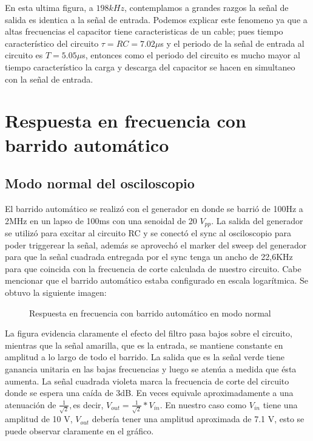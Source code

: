 En esta ultima figura, a $198kHz$, contemplamos a grandes razgos la señal de salida es identica a la señal de entrada. Podemos explicar este fenomeno ya que a altas frecuencias el capacitor tiene caracteristicas de un cable; pues tiempo característico del circuito $\tau = RC = 7.02\mu$s y el periodo de la señal de entrada al circuito es $T=5.05\mu$s, entonces como el periodo del circuito es mucho mayor al tiempo característico la carga y descarga del capacitor se hacen en simultaneo con la señal de entrada. 


\section{Respuesta en frecuencia con barrido automático}

\subsection{Modo normal del osciloscopio}

El barrido automático se realizó con el generador en donde se barrió de 100Hz a 2MHz en un lapso de 100ms con una senoidal
de 20 $V_{pp}$. La salida del generador se utilizó para excitar al circuito RC y se conectó el sync al osciloscopio para poder triggerear la señal, además se aprovechó el marker del sweep del generador para que la señal cuadrada entregada por el sync tenga un ancho de 22,6KHz para que coincida con la frecuencia de corte calculada de nuestro circuito.
Cabe mencionar que el barrido automático estaba configurado en escala logarítmica. Se obtuvo la siguiente imagen:

\begin{figure}[H]
\begin{center}
\par\end{center}
\caption{Respuesta en frecuencia con barrido automático en modo normal}
\end{figure}

La figura evidencia claramente el efecto del filtro pasa bajos sobre el circuito, mientras que la señal amarilla, que es la entrada, se mantiene constante en amplitud a lo largo de todo el barrido. La salida que es la señal verde tiene ganancia unitaria en las bajas frecuencias y luego se atenúa a medida que ésta aumenta. La señal cuadrada violeta
marca la frecuencia de corte del circuito donde se espera una caída de 3dB. En veces equivale aproximadamente a una atenuación de $\frac{1}{\sqrt{2}},$es
decir, $V_{out}=\frac{1}{\sqrt{2}}*V_{in}$. En nuestro caso como $V_{in}$ tiene
una amplitud de 10 V, $V_{out}$ debería tener una amplitud aproximada de 7.1 V, esto se puede observar claramente en el gráfico.

